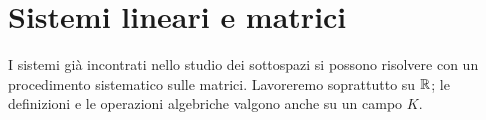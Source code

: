 \chapter{Sistemi lineari e matrici}
\label{cap:sistemi-matrici}

I sistemi già incontrati nello studio dei sottospazi si possono risolvere con un procedimento sistematico sulle matrici. Lavoreremo soprattutto su $\mathbb{R}$; le definizioni e le operazioni algebriche valgono anche su un campo $K$.



